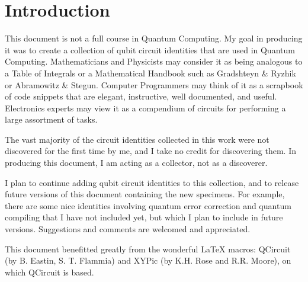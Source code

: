 \chapter{Introduction}

This document is not
a  full course in Quantum Computing.
My goal in producing it
was to create a collection of
qubit circuit identities
that are used
in Quantum Computing.
Mathematicians and
Physicists may consider it
 as being analogous to a
Table of Integrals  or a
 Mathematical Handbook
such as Gradshteyn \& Ryzhik
or Abramowitz \& Stegun.
Computer Programmers may think of it
as a scrapbook of code snippets
that are elegant, instructive,
well documented, and useful.
Electronics experts
may view it as a compendium of
circuits for performing
a large assortment of
tasks.

The vast majority of the  circuit
identities collected in this work
were not discovered for the first time by me, and
I take no credit for discovering them.
In producing this document, I am
acting as a collector,
not as a discoverer.

I plan to
continue adding
qubit circuit identities to this
collection, and to release future versions
of this document
containing the new specimens.
For example, there are some
nice identities involving
quantum error correction and quantum
compiling that I have not included yet,
but which I plan to include in future versions.
Suggestions and comments are
welcomed and appreciated.

This document benefitted greatly
from the wonderful LaTeX
macros: QCircuit (by
B. Eastin, S. T. Flammia)
and XYPic (by K.H. Rose and R.R. Moore),
on which QCircuit is based.
